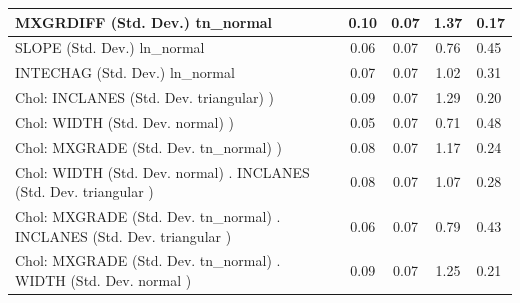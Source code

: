 \begin{table}
\begin{center}
\begin{tabular}{|l|l|c|c|c|l|}
			\hline
			MXGRDIFF (Std. Dev.) tn_normal &  & 0.10 & 0.07 & 1.37 & 0.17 \\
			\hline
			SLOPE (Std. Dev.) ln_normal &  & 0.06 & 0.07 & 0.76 & 0.45 \\
			\hline
			INTECHAG (Std. Dev.) ln_normal &  & 0.07 & 0.07 & 1.02 & 0.31 \\
			\hline
			 Chol: INCLANES (Std. Dev. triangular) ) &  & 0.09 & 0.07 & 1.29 & 0.20 \\
			\hline
			 Chol: WIDTH (Std. Dev. normal) ) &  & 0.05 & 0.07 & 0.71 & 0.48 \\
			\hline
			 Chol: MXGRADE (Std. Dev. tn_normal) ) &  & 0.08 & 0.07 & 1.17 & 0.24 \\
			\hline
			 Chol: WIDTH (Std. Dev. normal) . INCLANES (Std. Dev.   triangular ) &  & 0.08 & 0.07 & 1.07 & 0.28 \\
			\hline
			 Chol: MXGRADE (Std. Dev. tn_normal) . INCLANES (Std. Dev.   triangular ) &  & 0.06 & 0.07 & 0.79 & 0.43 \\
			\hline
			 Chol: MXGRADE (Std. Dev. tn_normal) . WIDTH (Std. Dev.   normal ) &  & 0.09 & 0.07 & 1.25 & 0.21 \\
			\hline
		\end{tabular}
	\end{center}
\end{table}